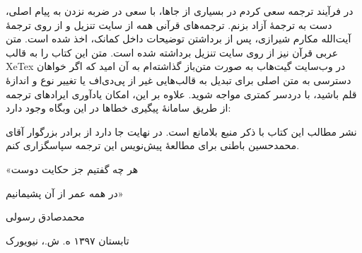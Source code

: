 {	در فرآیند ترجمه سعی کردم در بسیاری از جاها، با سعی در ضربه نزدن به پیام اصلی، دست به ترجمهٔ آزاد بزنم. ترجمه‌های قرآنی همه از سایت تنزیل و از روی ترجمهٔ آیت‌الله مکارم شیرازی، پس از برداشتن توضیحات داخل کمانک، اخذ شده است. متن عربی قرآن نیز از روی سایت تنزیل برداشته شده است. متن این کتاب را به قالب XeTex در وب‌سایت گیت‌هاب‌‌ به صورت متن‌باز گذاشته‌ام به آن امید که اگر خواهان دسترسی به متن اصلی برای تبدیل به قالب‌هایی غیر از پی‌دی‌اف یا تغییر نوع و اندازهٔ قلم باشید، با دردسر کمتری مواجه شوید. علاوه بر این، امکان یادآوری ایرادهای ترجمه از طریق سامانهٔ پیگیری خطاها در این وبگاه وجود دارد:
	\begin{center}
	\end{center}
	نشر مطالب این کتاب با ذکر منبع بلامانع است. در نهایت جا دارد از برادر بزرگوار آقای محمدحسین باطنی برای مطالعهٔ پیش‌نویس این ترجمه سپاسگزاری کنم. 
	
	\begin{center}
		«هر چه گفتیم جز حکایت دوست
		
		در همه عمر از آن پشیمانیم»
	\end{center}
	\begin{flushleft}
		{
			محمدصادق رسولی
			
			تابستان ۱۳۹۷ ه. ش.،	نیویورک
		}
	\end{flushleft}
	
}













